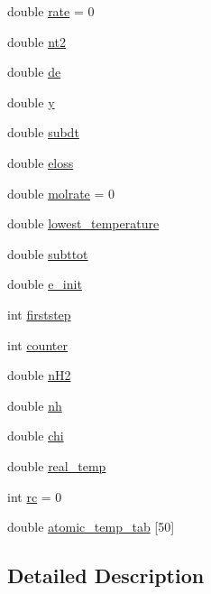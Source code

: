 \begin{DoxyCompactItemize}
\item 
double \hyperlink{classRadiativeCooling_a1cf3e2d454fc10f9fccbb852ee695f00}{rate} = 0
\item 
double \hyperlink{classRadiativeCooling_a0260589b7ce87bbb1e6025d4401c4d51}{nt2}
\item 
double \hyperlink{classRadiativeCooling_a85248406628c182c53dd0b3008424252}{de}
\item 
double \hyperlink{classRadiativeCooling_ad65d0d684858b39a7a5868c82cefb3ef}{y}
\item 
double \hyperlink{classRadiativeCooling_ae90c185e4b9381e4efa366d139424094}{subdt}
\item 
double \hyperlink{classRadiativeCooling_a01860e9a61b8749cf7321a7874299cbf}{eloss}
\item 
double \hyperlink{classRadiativeCooling_a1965ec0557b30cb94a6b087077d6515c}{molrate} = 0
\item 
double \hyperlink{classRadiativeCooling_a92b6cd85ed9223ddd0f589b7893c6a34}{lowest\+\_\+temperature}
\item 
double \hyperlink{classRadiativeCooling_a5a988535d13728b0172af4b8d56f6d1e}{subttot}
\item 
double \hyperlink{classRadiativeCooling_a3ab20e52a22924d92b1e787738922e65}{e\+\_\+init}
\item 
int \hyperlink{classRadiativeCooling_a4265ab110120e91ec2ce6f67c7607265}{firststep}
\item 
int \hyperlink{classRadiativeCooling_afc01b8e960c5944ab6ab64d49ddd7c3d}{counter}
\item 
double \hyperlink{classRadiativeCooling_ad20df3317662e7a9a4efbd6d0f95da0d}{n\+H2}
\item 
double \hyperlink{classRadiativeCooling_ac1c50a85824b4384c49ba63fa20776fb}{nh}
\item 
double \hyperlink{classRadiativeCooling_ace98b0d81ac465183e8fd4313ad64c51}{chi}
\item 
double \hyperlink{classRadiativeCooling_add889979d656eaa44d7aae3360172279}{real\+\_\+temp}
\item 
int \hyperlink{classRadiativeCooling_a4704c62742e49819ebdc7d8e8be8568f}{rc} = 0
\item 
double \hyperlink{classRadiativeCooling_a69beea13540c13fe1a9e133388c5c943}{atomic\+\_\+temp\+\_\+tab} \mbox{[}50\mbox{]}
\end{DoxyCompactItemize}


\subsection{Detailed Description}


